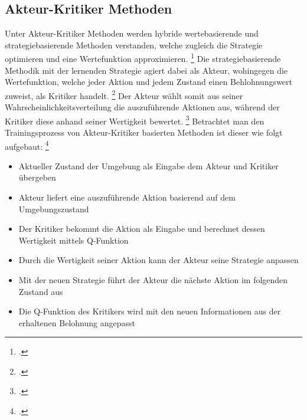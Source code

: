 \subsection{Akteur-Kritiker Methoden}
Unter Akteur-Kritiker Methoden werden hybride wertebasierende und strategiebasierende Methoden verstanden, welche zugleich die Strategie optimieren und eine Wertefunktion approximieren. \footcite[Vgl.][S. 2f.]{Zhang.2018}
Die strategiebasierende Methodik mit der lernenden Strategie agiert dabei als Akteur, wohingegen die Wertefunktion, welche jeder Aktion und jedem Zustand einen Behlohnungswert zuweist, als Kritiker handelt. \footcite[Vgl.][S. 321]{Sutton.2018}
Der Akteur wählt somit aus seiner Wahrscheinlichkeitsverteilung die auszuführende Aktionen aus, während der Kritiker diese anhand seiner Wertigkeit bewertet. \footcite[Vgl.][S. 3]{Ningombam.2022}
Betrachtet man den Trainingsprozess von Akteur-Kritiker basierten Methoden ist dieser wie folgt aufgebaut: \footcite[Vgl.][S. 4]{Ningombam.2022}
\begin{itemize}
    \item Aktueller Zustand der Umgebung als Eingabe dem Akteur und Kritiker übergeben
    \item Akteur liefert eine auszuführende Aktion basierend auf dem Umgebungszustand
    \item Der Kritiker bekommt die Aktion als Eingabe und berechnet dessen Wertigkeit mittels Q-Funktion
    \item Durch die Wertigkeit seiner Aktion kann der Akteur seine Strategie anpassen
    \item Mit der neuen Strategie führt der Akteur die nächste Aktion im folgenden Zustand aus
    \item Die Q-Funktion des Kritikers wird mit den neuen Informationen aus der erhaltenen Belohnung angepasst
\end{itemize}

